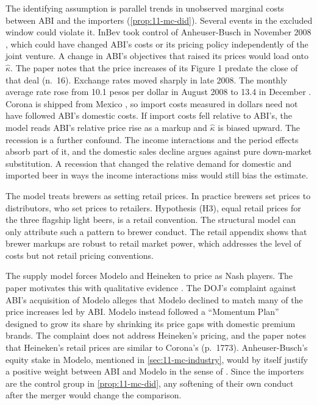 The identifying assumption is parallel trends in unobserved marginal costs between ABI and the importers
(\cref{prop:11-mc-did}). Several events in the excluded window could violate it. InBev took control of Anheuser-Busch
in November 2008 \citep[p.~1784]{MillerWeinberg2017}, which could have changed ABI's costs or its pricing policy
independently of the joint venture. A change in ABI's objectives that raised its prices would load onto $\hat\kappa$.
The paper notes that the price increases of its Figure 1 predate the close of that deal (n.~16). Exchange rates moved
sharply in late 2008. The monthly average rate rose from 10.1 pesos per dollar in August 2008 to 13.4 in December
\citep{FederalReserve2026}. Corona is shipped from Mexico \citep[n.~4]{MillerWeinberg2017}, so import costs measured
in dollars need not have followed ABI's domestic costs. If import
costs fell relative to ABI's, the model reads ABI's relative price rise as a markup and $\hat\kappa$ is biased upward.
The recession is a further confound. The income interactions and the period effects absorb part of it, and the
domestic sales decline argues against pure down-market substitution. A recession that changed the relative demand for
domestic and imported beer in ways the income interactions miss would still bias the estimate.

The model treats brewers as setting retail prices. In practice brewers set prices to distributors, who set prices to
retailers. Hypothesis (H3), equal retail prices for the three flagship light beers, is a retail convention. The
structural model can only attribute such a pattern to brewer conduct. The retail appendix shows that brewer markups
are robust to retail market power, which addresses the level of costs but not retail pricing conventions.

The supply model forces Modelo and Heineken to price as Nash players. The paper motivates this with qualitative
evidence \citep[pp.~1773 and 1779]{MillerWeinberg2017}. The DOJ's complaint against ABI's acquisition of Modelo
alleges that Modelo declined to match many of the price increases led by ABI.
Modelo instead followed a ``Momentum Plan'' designed to grow its share by shrinking its price gaps with domestic premium brands. The complaint does not address Heineken's pricing, and the
paper notes that Heineken's retail prices are similar to Corona's (p.~1773). Anheuser-Busch's equity stake in Modelo, mentioned in \cref{sec:11-mc-industry}, would by itself justify a positive
weight between ABI and Modelo in the sense of \citet{OBrienSalop2000}. Since the importers are the control group in
\cref{prop:11-mc-did}, any softening of their own conduct after the merger would change the comparison.

